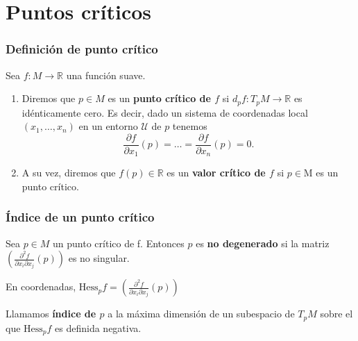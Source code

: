 \documentclass[11pt]{beamer}
\begin{document}

\section{Puntos críticos}
\begin{frame}
\frametitle{Definición de punto crítico}
	\begin{definition}
    Sea $f: M \to \mathbb{R}$ una función suave.
    \begin{enumerate}[label=(\roman*)]
        \item Diremos que $p\in M$ es un \textbf{punto crítico de $f$} si $d_{p}f:T_{p}M\to \mathbb{R}$ es idénticamente cero. Es decir, dado un sistema de coordenadas local $(x_{1}, \dots ,x_{n})$ en un entorno $\mathcal{U}$ de $p$ tenemos
        \begin{equation*}
            \frac{\partial f}{\partial x_1}(p)= \dots = \frac{\partial f}{\partial x_n}(p) = 0.
        \end{equation*}
        
        \item A su vez, diremos que $f(p)\in \mathbb{R}$ es un \textbf{valor crítico de $f$} si $p \in \mathrm{M}$ es un punto crítico.
        
    \end{enumerate}
	\end{definition}
\end{frame}




\begin{frame}
\frametitle{Índice de un punto crítico}
	\begin{definition}
    	Sea $p\in M$ un punto crítico de f. Entonces $p$ es \textbf{no degenerado} si la matriz  $\left(\frac{\partial^{2}f}{\partial x_i \partial x_j}(p)\right)$ es no singular.
	\end{definition}
	\bigskip
	En coordenadas, $\text{Hess}_pf = \left(\frac{\partial^{2}f}{\partial x_i \partial x_j}(p)\right)$ 
	\bigskip
	\begin{definition}
		Llamamos \textbf{índice de $p$} a la máxima dimensión de un subespacio de $T_pM$ sobre el que $\text{Hess}_pf$ es definida negativa.
	\end{definition}
\end{frame}
\end{document}
